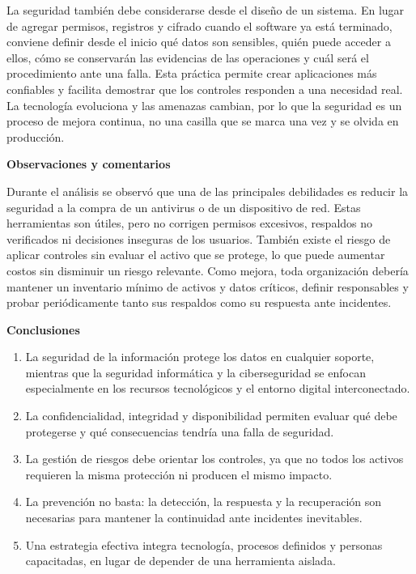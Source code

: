 \documentclass[12pt,letterpaper]{article}
\begin{document}
La seguridad también debe considerarse desde el diseño de un sistema. En lugar de agregar permisos, registros y cifrado cuando el software ya está terminado, conviene definir desde el inicio qué datos son sensibles, quién puede acceder a ellos, cómo se conservarán las evidencias de las operaciones y cuál será el procedimiento ante una falla. Esta práctica permite crear aplicaciones más confiables y facilita demostrar que los controles responden a una necesidad real. La tecnología evoluciona y las amenazas cambian, por lo que la seguridad es un proceso de mejora continua, no una casilla que se marca una vez y se olvida en producción.

\textbf{Observaciones y comentarios}

Durante el análisis se observó que una de las principales debilidades es reducir la seguridad a la compra de un antivirus o de un dispositivo de red. Estas herramientas son útiles, pero no corrigen permisos excesivos, respaldos no verificados ni decisiones inseguras de los usuarios. También existe el riesgo de aplicar controles sin evaluar el activo que se protege, lo que puede aumentar costos sin disminuir un riesgo relevante. Como mejora, toda organización debería mantener un inventario mínimo de activos y datos críticos, definir responsables y probar periódicamente tanto sus respaldos como su respuesta ante incidentes.

\textbf{Conclusiones}

\begin{enumerate}[label=\arabic*., leftmargin=*, itemsep=1pt]
    \item La seguridad de la información protege los datos en cualquier soporte, mientras que la seguridad informática y la ciberseguridad se enfocan especialmente en los recursos tecnológicos y el entorno digital interconectado.
    \item La confidencialidad, integridad y disponibilidad permiten evaluar qué debe protegerse y qué consecuencias tendría una falla de seguridad.
    \item La gestión de riesgos debe orientar los controles, ya que no todos los activos requieren la misma protección ni producen el mismo impacto.
    \item La prevención no basta: la detección, la respuesta y la recuperación son necesarias para mantener la continuidad ante incidentes inevitables.
    \item Una estrategia efectiva integra tecnología, procesos definidos y personas capacitadas, en lugar de depender de una herramienta aislada.
\end{enumerate}
\end{document}
